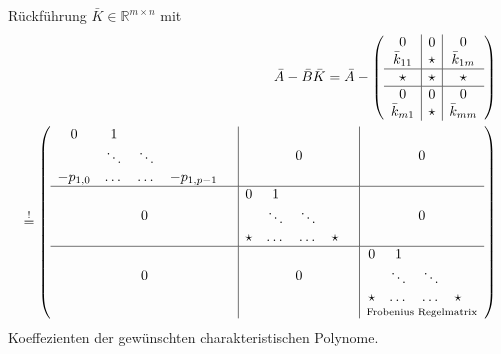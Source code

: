 \documentclass[ngerman]{tudscrreprt}
\begin{document}
Rückführung $\bar K \in \mathbb{R}^{m\times n}$ mit 
\begin{align*} \bar A - \bar B \bar K = \bar A - 
\left(\begin{array}{c | c | c }
\begin{matrix} 0\\ \bar k_{11} \end{matrix} 
&
\begin{matrix} 0\\ \star \end{matrix}
&
\begin{matrix} 0\\ \bar k_{1m} \end{matrix}\\
\hline
\star & \star & \star \\
\hline 
\begin{matrix} 0\\ \bar k_{m1} \end{matrix} & \begin{matrix} 0\\ \star \end{matrix} & \begin{matrix} 0\\ \bar k_{mm} \end{matrix}
\end{array}\right)\\ \overset{!}{=} 
\left(\begin{array}{ c | c | c }
\begin{matrix} 0 & 1 & &&\\ &\ddots&\ddots&\\-p_{1,0}&\dots& \dots&-p_{1,p-1} \end{matrix} & 0 & 0 \\ 
\hline 
0 & \begin{matrix} 0 & 1 & &&\\ &\ddots&\ddots&\\\star&\dots&\dots &\star\end{matrix} & 0\\ \hline
0& 0& \underset{\text{Frobenius Regelmatrix}}{\begin{matrix} 0 & 1 & &&\\&\ddots&\ddots&\\\star&\dots& \dots&\star \end{matrix}}
\end{array}\right)
\end{align*} Koeffezienten der gewünschten charakteristischen Polynome. \\ 
\end{document}
